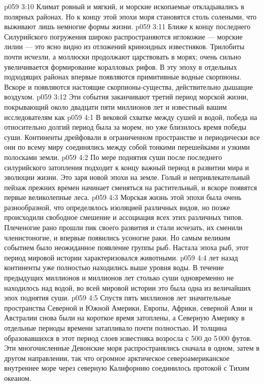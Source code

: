 \vs p059 3:10 Климат ровный и мягкий, и морские ископаемые откладывались в полярных районах. Но к концу этой эпохи моря становятся столь солеными, что выживают лишь немногие формы жизни.
\vs p059 3:11 Ближе к концу последнего Силурийского погружения широко распространяются иглокожие --- морские лилии --- это ясно видно из отложений криноидных известняков. Трилобиты почти исчезли, а моллюски продолжают царствовать в морях; очень сильно увеличивается формирование коралловых рифов. В эту эпоху в отдельных подходящих районах впервые появляются примитивные водные скорпионы. Вскоре и  появляются настоящие скорпионы\hyp{}существа, действительно дышащие воздухом.
\vs p059 3:12 Эти события заканчивают третий период морской жизни, покрывающий около двадцати пяти миллионов лет и известный вашим исследователям как 
\vs p059 4:1 В вековой схватке между сушей и водой, победа на относительно долгий период была за морем, но уже близилось время победы суши. Континенты дрейфовали в ограниченном пространстве и периодически все они по всему миру соединялись между собой тонкими перешейками и узкими полосками земли.
\vs p059 4:2 По мере поднятия суши после последнего силурийского затопления подходит к концу важный период в развитии мира и эволюции жизни. Это заря новой эпохи на земле. Голый и непривлекательный пейзаж прежних времен начинает сменяться на растительный, и вскоре появятся первые великолепные леса.
\vs p059 4:3 Морская жизнь этой эпохи была очень разнообразной, что определялось изоляцией различных видов, но позже происходили свободное смешение и ассоциация всех этих различных типов. Плеченогие рано прошли пик своего развития и стали исчезать, их сменили членистоногие, и впервые появились усоногие раки. Но самым великим событием было неожиданное появление группы рыб. Настала эпоха рыб, этот период мировой истории характеризовался  животными.
\vs p059 4:4 \pc {} лет назад континенты уже полностью находились выше уровня воды. В течение предыдущих миллионов и миллионов лет столько суши одновременно не находилось над водой, во всей мировой истории это была одна из величайших эпох поднятия суши.
\vs p059 4:5 Спустя пять миллионов лет значительные пространства Северной и Южной Америки, Европы, Африки, северной Азии и Австралии снова были на короткое время затоплены, а Северную Америку в отдельные периоды времени затапливало почти полностью. И толщина образовавшихся в этот период слоев известняка возросла с 500 до 5\,000 футов. Эти многочисленные Девонские моря распространялись сначала в одном, затем в другом направлении, так что огромное арктическое североамериканское внутреннее море через северную Калифорнию соединилось протокой с Тихим океаном.
